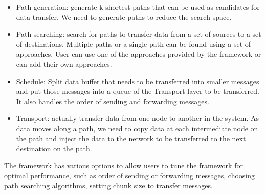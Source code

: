 \begin{itemize}
\item Path generation: generate k shortest paths that can be used as candidates for data transfer. We need to generate paths to reduce the search space.
\item Path searching: search for paths to transfer data from a set of sources to a set of destinations. Multiple paths or a single path can be found using a set of approaches. User can use one of the approaches provided by the framework or can add their own approaches.
\item Schedule: Split data buffer that needs to be transferred into smaller messages and put those messages into a queue of the Transport layer to be transferred. It also handles the order of sending and forwarding messages.
\item Transport: actually transfer data from one node to another in the system. As data moves along a path, we need to copy data at each intermediate node on the path and inject the data to the network to be transferred to the next destination on the path.
\end{itemize}
The framework has various options to allow users to tune the framework for optimal performance, such as order of sending or forwarding messages, choosing path searching algorithms, setting chunk size to transfer messages. 
